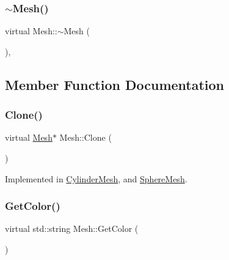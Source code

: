 \subsubsection{\texorpdfstring{$\sim$Mesh()}{~Mesh()}\hspace{0.1cm}{\footnotesize\ttfamily [2/2]}}
{\footnotesize\ttfamily virtual Mesh\+::$\sim$\+Mesh (\begin{DoxyParamCaption}{ }\end{DoxyParamCaption})\hspace{0.3cm}{\ttfamily [inline]}, {\ttfamily [virtual]}}



\subsection{Member Function Documentation}
\mbox{\label{class_mesh_a11928acab4066671d10e9e531ad96fb6}} 
\subsubsection{\texorpdfstring{Clone()}{Clone()}}
{\footnotesize\ttfamily virtual \mbox{\hyperlink{class_mesh}{Mesh}}$\ast$ Mesh\+::\+Clone (\begin{DoxyParamCaption}{ }\end{DoxyParamCaption})\hspace{0.3cm}{\ttfamily [pure virtual]}}



Implemented in \mbox{\hyperlink{class_cylinder_mesh_ad9e278dd523b06090b4e64f70a262575}{Cylinder\+Mesh}}, and \mbox{\hyperlink{class_sphere_mesh_a5dfa031b4cdd31a81154221c882a5dfa}{Sphere\+Mesh}}.

\mbox{\label{class_mesh_aa413c0ccbc081aa50a2946e1c6930b0c}} 
\subsubsection{\texorpdfstring{GetColor()}{GetColor()}}
{\footnotesize\ttfamily virtual std\+::string Mesh\+::\+Get\+Color (\begin{DoxyParamCaption}{ }\end{DoxyParamCaption})\hspace{0.3cm}{\ttfamily [pure virtual]}}



